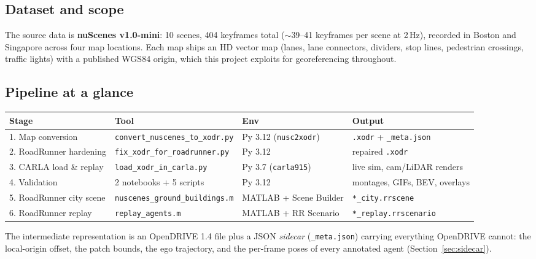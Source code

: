 \documentclass[11pt]{article}
\newcommand{\file}[1]{\texttt{#1}}
\begin{document}
\subsection{Dataset and scope}
The source data is \textbf{nuScenes v1.0-mini}: 10 scenes, 404 keyframes total
($\sim$39--41 keyframes per scene at 2\,Hz), recorded in Boston and Singapore across
four map locations. Each map ships an HD vector map (lanes, lane connectors, dividers,
stop lines, pedestrian crossings, traffic lights) with a published WGS84 origin, which
this project exploits for georeferencing throughout.

\subsection{Pipeline at a glance}
\begin{center}
\scriptsize
\setlength{\tabcolsep}{4pt}
\begin{tabular}{@{}llll@{}}
\toprule
\textbf{Stage} & \textbf{Tool} & \textbf{Env} & \textbf{Output} \\
\midrule
1. Map conversion & \file{convert\_nuscenes\_to\_xodr.py} & Py 3.12 (\file{nusc2xodr}) & \file{.xodr} + \file{\_meta.json} \\
2. RoadRunner hardening & \file{fix\_xodr\_for\_roadrunner.py} & Py 3.12 & repaired \file{.xodr} \\
3. CARLA load \& replay & \file{load\_xodr\_in\_carla.py} & Py 3.7 (\file{carla915}) & live sim, cam/LiDAR renders \\
4. Validation & 2 notebooks + 5 scripts & Py 3.12 & montages, GIFs, BEV, overlays \\
5. RoadRunner city scene & \file{nuscenes\_ground\_buildings.m} & MATLAB + Scene Builder & \file{*\_city.rrscene} \\
6. RoadRunner replay & \file{replay\_agents.m} & MATLAB + RR Scenario & \file{*\_replay.rrscenario} \\
\bottomrule
\end{tabular}
\end{center}

The intermediate representation is an OpenDRIVE 1.4 file plus a JSON \emph{sidecar}
(\file{\_meta.json}) carrying everything OpenDRIVE cannot: the local-origin offset, the
patch bounds, the ego trajectory, and the per-frame poses of every annotated agent
(Section~\ref{sec:sidecar}).
\end{document}
